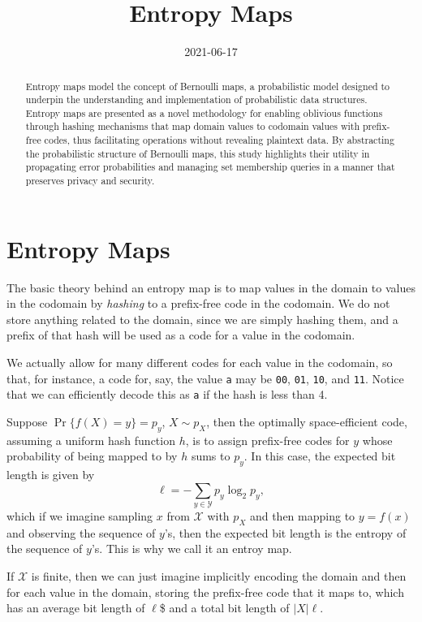 \documentclass[
]{article}
\title{Entropy Maps}
\author{}
\date{\vspace{-2.5em}2021-06-17}
\begin{document}
\maketitle
\begin{abstract}
Entropy maps model the concept of Bernoulli maps, a probabilistic model
designed to underpin the understanding and implementation of
probabilistic data structures. Entropy maps are presented as a novel
methodology for enabling oblivious functions through hashing mechanisms
that map domain values to codomain values with prefix-free codes, thus
facilitating operations without revealing plaintext data. By abstracting
the probabilistic structure of Bernoulli maps, this study highlights
their utility in propagating error probabilities and managing set
membership queries in a manner that preserves privacy and security.
\end{abstract}

{
\setcounter{tocdepth}{2}
\tableofcontents
}
\hypertarget{entropy-maps}{%
\section{Entropy Maps}\label{entropy-maps}}

The basic theory behind an entropy map is to map values in the domain to
values in the codomain by \emph{hashing} to a prefix-free code in the
codomain. We do not store anything related to the domain, since we are
simply hashing them, and a prefix of that hash will be used as a code
for a value in the codomain.

We actually allow for many different codes for each value in the
codomain, so that, for instance, a code for, say, the value \texttt{a}
may be \texttt{00}, \texttt{01}, \texttt{10}, and \texttt{11}. Notice
that we can efficiently decode this as \texttt{a} if the hash is less
than 4.

Suppose \(\Pr\{f(X) = y\} = p_y\), \(X \sim p_X\), then the optimally
space-efficient code, assuming a uniform hash function \(h\), is to
assign prefix-free codes for \(y\) whose probability of being mapped to
by \(h\) sums to \(p_y\). In this case, the expected bit length is given
by \[
    \ell = -\sum_{y \in \mathcal{Y}} p_y \log_2 p_y,
\] which if we imagine sampling \(x\) from \(\mathcal{X}\) with \(p_X\)
and then mapping to \(y = f(x)\) and observing the sequence of \(y\)'s,
then the expected bit length is the entropy of the sequence of \(y\)'s.
This is why we call it an entroy map.

If \(\mathcal{X}\) is finite, then we can just imagine implicitly
encoding the domain and then for each value in the domain, storing the
prefix-free code that it maps to, which has an average bit length of
\(\ell\)\$ and a total bit length of \(|X| \ell\).
\end{document}
